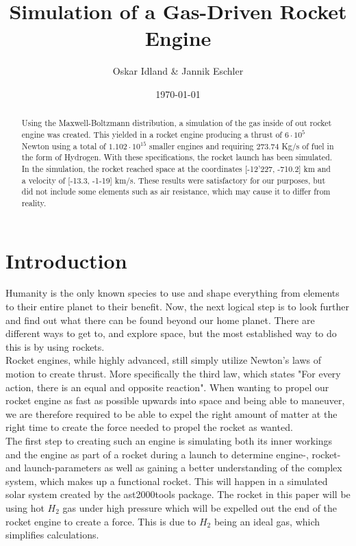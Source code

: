 \documentclass[reprint,english,notitlepage]{revtex4-2}
\begin{document}
\title{Simulation of a Gas-Driven Rocket Engine}
\author{Oskar Idland \& Jannik Eschler}
\date{\today}

\begin{abstract}
	Using the Maxwell-Boltzmann distribution, a simulation of the gas inside of out rocket engine was created.
	This yielded in a rocket engine producing a thrust of $6 \cdot 10^{5}$ Newton using a total of $1.102 \cdot 10^{15}$ smaller engines and requiring $273.74$ Kg/s of fuel in the form of Hydrogen.
	With these specifications, the rocket launch has been simulated.
	In the simulation, the rocket reached space at the coordinates [-12'227, -710.2] km and a velocity of [-13.3, -1-19] km/s.
	These results were satisfactory for our purposes, but did not include some elements such as air resistance, which may cause it to differ from reality.

\end{abstract}
\maketitle

\section{Introduction}
Humanity is the only known species to use and shape everything from elements to their entire planet to their benefit.
Now, the next logical step is to look further and find out what there can be found beyond our home planet.
There are different ways to get to, and explore space, but the most established way to do this is by using rockets.\\
Rocket engines, while highly advanced, still simply utilize Newton's laws of motion to create thrust.
More specifically the third law, which states "For every action, there is an equal and opposite reaction".
When wanting to propel our rocket engine as fast as possible upwards into space and being able to maneuver, we are therefore required
to be able to expel the right amount of matter at the right time to create the force needed to propel the rocket as wanted.\\
The first step to creating such an engine is simulating both its inner workings and the engine as part of a rocket during a launch to determine engine-, rocket- and launch-parameters
as well as gaining a better understanding of the complex system, which makes up a functional rocket. This will happen in a simulated solar system created by the ast2000tools package.
The rocket in this paper will be using hot $ H_2 $ gas under high pressure which will be expelled out the end of the rocket engine to create a force.
This is due to $H_2$ being an ideal gas, which simplifies calculations.
\end{document}
